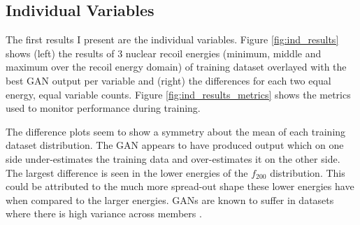 \documentclass[11pt]{article} %
\begin{document}
\subsection{Individual Variables}
The first results I present are the individual variables.
Figure \ref{fig:ind_results} shows (left) the results of 3 nuclear recoil energies (minimum, middle and maximum over the recoil energy domain)
of training dataset overlayed with the best GAN output per variable and
(right) the differences for each two equal energy, equal variable counts.
Figure \ref{fig:ind_results_metrics} shows the metrics used to monitor performance during training.
\\
\par The difference plots seem to show a symmetry about the mean of each training dataset distribution.
The GAN appears to have produced output which on one side under-estimates the training data and over-estimates it
on the other side.
The largest difference is seen in the lower energies of the $f_{200}$ distribution.
This could be attributed to the much more spread-out shape these lower energies have when compared to the larger energies.
GANs are known to suffer in datasets where there is high variance across members \cite{yazici2018autoregressive}.
\end{document}
